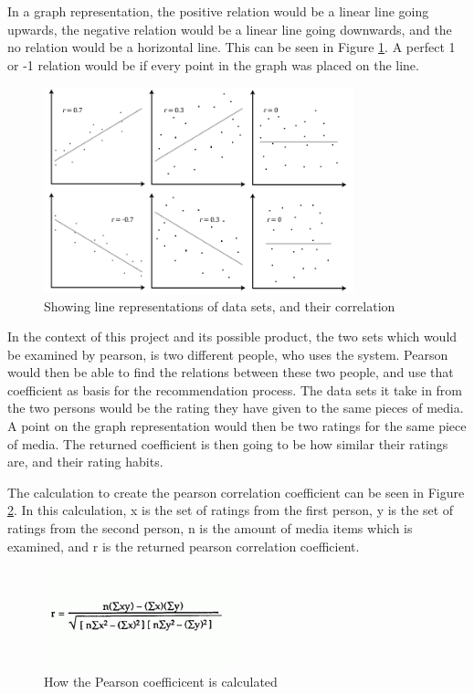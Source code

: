 In a graph representation, the positive relation would be a linear line going upwards, the negative relation would be a linear line going downwards, and the no relation would be a horizontal line. This can be seen in Figure \ref{Pearson1}. A perfect 1 or -1 relation would be if every point in the graph was placed on the line. \cite{Pearson1}

\begin{figure}[htb]
\centering
\includegraphics[width=0.8\textwidth]{Images/pearson1.png}
\caption{Showing line representations of data sets, and their correlation}
\label{Pearson1}
\end{figure}

In the context of this project and its possible product, the two sets which would be examined by pearson, is two different people, who uses the system. Pearson would then be able to find the relations between these two people, and use that coefficient as basis for the recommendation process. The data sets it take in from the two persons would be the rating they have given to the same pieces of media. A point on the graph representation would then be two ratings for the same piece of media. The returned coefficient is then going to be how similar their ratings are, and their rating habits.

The calculation to create the pearson correlation coefficient can be seen in Figure \ref{PearsonCalc}. In this calculation, x is the set of ratings from the first person, y is the set of ratings from the second person, n is the amount of media items which is examined, and r is the returned pearson correlation coefficient. \cite{Pearson1}

\begin{figure}[htb]
\centering
\includegraphics[width=0.5\textwidth]{Images/pearsonCalc.png}
\caption{How the Pearson coefficicent is calculated}
\label{PearsonCalc}
\end{figure}

